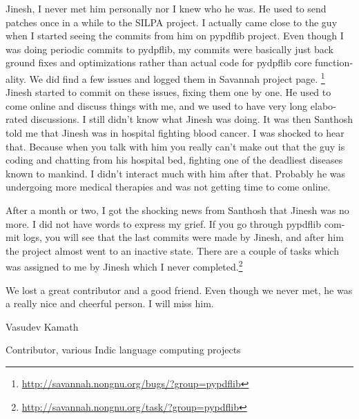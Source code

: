 \begin{english}

Jinesh, I never met him personally nor I knew who he was. He used to
send patches once in a while to the SILPA project. I actually came close
to the guy when I started seeing the commits from him on pypdflib
project. Even though I was doing periodic commits to pydpflib, my
commits were basically just back ground fixes and optimizations rather than
actual code for pydpflib core functionality. We did find a few issues
and logged them in Savannah project page. \footnote{\url{http://savannah.nongnu.org/bugs/?group=pypdflib}} Jinesh started to
commit on these issues, fixing them one by one. He used to come online
and discuss things with me, and we used to have very long elaborated
discussions. I still didn't know what Jinesh was doing. It was then
Santhosh told me that Jinesh was in hospital fighting blood cancer. I was shocked to hear that. Because when you talk with him you really
can't make out that the guy is coding and chatting from his hospital bed,
fighting one of the deadliest diseases known to mankind. I didn't
interact much with him after that. Probably he was undergoing
more medical therapies and was not getting time to come online.

After a month or two, I got the shocking news from Santhosh that Jinesh
was no more. I did not have words to express my grief. If you go through pypdflib
commit logs, you will see that the last commits were made by Jinesh, and after
him the project almost went to an inactive state. There are a couple of
tasks which was assigned to me by Jinesh which I never
completed.\footnote{\url{http://savannah.nongnu.org/task/?group=pypdflib}}

We lost a great contributor and a good friend. Even
though we never met, he was a really nice and cheerful person. I will
miss him.

\begin{flushright}Vasudev Kamath

Contributor, various Indic language computing projects\end{flushright}
 \end{english}
 \newpage
